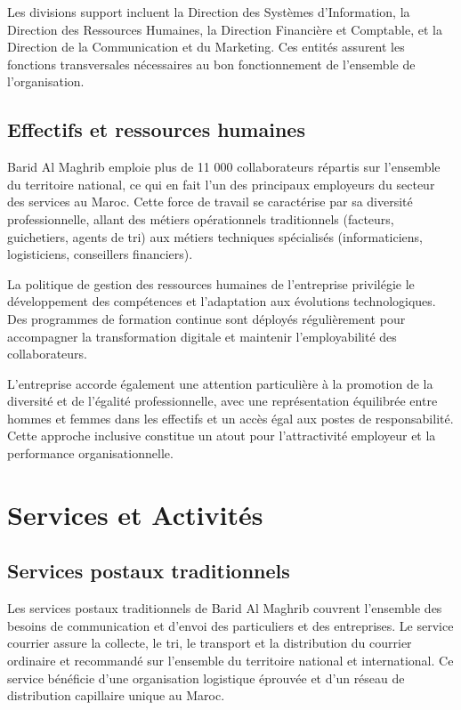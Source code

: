 Les divisions support incluent la Direction des Systèmes d'Information, la Direction des Ressources Humaines, la Direction Financière et Comptable, et la Direction de la Communication et du Marketing. Ces entités assurent les fonctions transversales nécessaires au bon fonctionnement de l'ensemble de l'organisation.

\subsection{Effectifs et ressources humaines}

Barid Al Maghrib emploie plus de 11 000 collaborateurs répartis sur l'ensemble du territoire national, ce qui en fait l'un des principaux employeurs du secteur des services au Maroc. Cette force de travail se caractérise par sa diversité professionnelle, allant des métiers opérationnels traditionnels (facteurs, guichetiers, agents de tri) aux métiers techniques spécialisés (informaticiens, logisticiens, conseillers financiers).

La politique de gestion des ressources humaines de l'entreprise privilégie le développement des compétences et l'adaptation aux évolutions technologiques. Des programmes de formation continue sont déployés régulièrement pour accompagner la transformation digitale et maintenir l'employabilité des collaborateurs.

L'entreprise accorde également une attention particulière à la promotion de la diversité et de l'égalité professionnelle, avec une représentation équilibrée entre hommes et femmes dans les effectifs et un accès égal aux postes de responsabilité. Cette approche inclusive constitue un atout pour l'attractivité employeur et la performance organisationnelle.

\section{Services et Activités}

\subsection{Services postaux traditionnels}

Les services postaux traditionnels de Barid Al Maghrib couvrent l'ensemble des besoins de communication et d'envoi des particuliers et des entreprises. Le service courrier assure la collecte, le tri, le transport et la distribution du courrier ordinaire et recommandé sur l'ensemble du territoire national et international. Ce service bénéficie d'une organisation logistique éprouvée et d'un réseau de distribution capillaire unique au Maroc.

